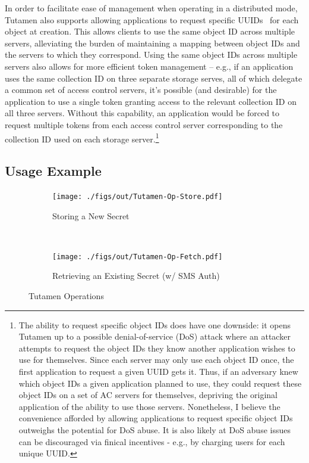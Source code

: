 In order to facilitate ease of management when operating in a
distributed mode, Tutamen also supports allowing applications to
request specific UUIDs~\cite{leach2005} for each object at creation.
This allows clients to use the same object ID across multiple servers,
alleviating the burden of maintaining a mapping between object IDs and
the servers to which they correspond. Using the same object IDs across
multiple servers also allows for more efficient token management --
e.g., if an application uses the same collection ID on three separate
storage serves, all of which delegate a common set of access control
servers, it's possible (and desirable) for the application to use a
single token granting access to the relevant collection ID on all
three servers. Without this capability, an application would be forced
to request multiple tokens from each access control server
corresponding to the collection ID used on each storage
server.\footnote{The ability to request specific object IDs does have
  one downside: it opens Tutamen up to a possible denial-of-service
  (DoS) attack where an attacker attempts to request the object IDs
  they know another application wishes to use for themselves. Since
  each server may only use each object ID once, the first application
  to request a given UUID gets it. Thus, if an adversary knew which
  object IDs a given application planned to use, they could request
  these object IDs on a set of AC servers for themselves, depriving
  the original application of the ability to use those
  servers. Nonetheless, I believe the convenience afforded by allowing
  applications to request specific object IDs outweighs the potential
  for DoS abuse. It is also likely at DoS abuse issues can be
  discouraged via finical incentives - e.g., by charging users for
  each unique UUID.}

\subsection{Usage Example}
\label{chap:tutamen:arch:example}

\begin{figure}[!t]
  \centering
  \begin{subfigure}[t]{0.48\textwidth}
    \texttt{[image: ./figs/out/Tutamen-Op-Store.pdf]}
    \caption{Storing a New Secret}
    \label{fig:tutamen:ops:store}
  \end{subfigure}
  ~
  \begin{subfigure}[t]{0.48\textwidth}
    \texttt{[image: ./figs/out/Tutamen-Op-Fetch.pdf]}
    \caption{Retrieving an Existing Secret (w/ SMS Auth)}
    \label{fig:tutamen:ops:fetch}
  \end{subfigure}
  \caption{Tutamen Operations}
  \label{fig:tutamen:ops}
\end{figure}

